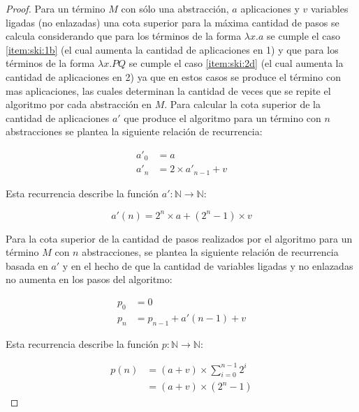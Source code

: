 \begin{proof}
  Para un término \( M \) con sólo una abstracción, \( \mathit{a} \) aplicaciones y \( \mathit{v} \) variables ligadas (no enlazadas) una cota superior para la máxima cantidad de pasos se calcula considerando que para los términos de la forma \( λx.a \) se cumple el caso \ref{item:ski:1b} (el cual aumenta la cantidad de aplicaciones en 1) y que para los términos de la forma \( λx.PQ \) se cumple el caso \ref{item:ski:2d} (el cual aumenta la cantidad de aplicaciones en 2) ya que en estos casos se produce el término con mas aplicaciones, las cuales determinan la cantidad de veces que se repite el algoritmo por cada abstracción en \( M \). Para calcular la cota superior de la cantidad de aplicaciones \( a' \) que produce el algoritmo para un término con \( n \) abstracciones se plantea la siguiente relación de recurrencia:

  \begin{align*}
    \mathit{a}'_{0} &= \mathit{a} \\
    \mathit{a}'_{n} &= 2 \times \mathit{a}'_{n-1} + \mathit{v}
  \end{align*}

  Esta recurrencia describe la función \( \mathit{a}' \colon \mathbb{N} \to \mathbb{N} \):

  \[ \mathit{a}'(n) = 2^{n} \times \mathit{a} + (2^{n}-1) \times \mathit{v} \]

  Para la cota superior de la cantidad de pasos realizados por el algoritmo para un término \( M \) con \( n \) abstracciones, se plantea la siguiente relación de recurrencia basada en \( \mathit{a}' \) y en el hecho de que la cantidad de variables ligadas y no enlazadas no aumenta en los pasos del algoritmo:

  \begin{align*}
    \mathit{p}_{0} &= 0 \\
    \mathit{p}_{n} &= \mathit{p}_{n-1} + \mathit{a}'(n-1) + \mathit{v}
  \end{align*}

  Esta recurrencia describe la función \( \mathit{p} \colon \mathbb{N} \to \mathbb{N} \):

  \begin{align*}
    \mathit{p}(n) &= (\mathit{a} + \mathit{v}) \times \sum_{i=0}^{n-1} 2^{i} \\
                  &= (\mathit{a} + \mathit{v}) \times (2^{n}-1)
  \end{align*}
  
\end{proof}


